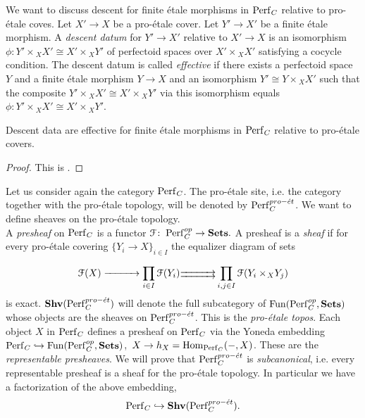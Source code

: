We want to discuss descent for finite \'{e}tale morphisms in $\mathrm{Perf}_{C}$ relative to pro-\'{e}tale coves.
Let $X'\to X$ be a pro-\'{e}tale cover. Let $Y'\to X'$ be a finite \'{e}tale morphism.
A \emph{descent datum} for $Y'\to X'$ relative to $X'\to X$ is an isomorphism $\phi\colon Y'\times\!_{X}X'\cong X'\times\!_{X}Y'$ of perfectoid spaces
over $X'\times\!_{X}X'$ satisfying a cocycle condition. The descent datum is called \emph{effective} if there exists a perfectoid space $Y$ and a finite \'{e}tale morphism $Y\to X$ and an isomorphism $Y'\cong  Y\times\!_{X}X'$ such that the composite $Y'\times\!_{X}X'\cong X'\times\!_{X}Y'$
via this isomorphism equals $\phi\colon Y'\times\!_{X}X'\cong X'\times\!_{X}Y'$.

\begin{prop}\label{descentprop1}
Descent data are effective for finite \'{e}tale morphisms in $\mathrm{Perf}_{C}$ relative to pro-\'{e}tale covers.
\end{prop}
\begin{proof}
This is \cite[proposition 4.2.4]{Weinstein16}.
\end{proof}



Let us consider again the category $\mathrm{Perf}_{C}$. The pro-\'{e}tale site, i.e. the category together with the pro-\'{e}tale topology, will be denoted by $\mathrm{Perf}_{C}^{pro-\acute{e}t}$. We want to define sheaves on the pro-\'{e}tale topology.\\

A \emph{presheaf} on $\mathrm{Perf}_{C}$ is a functor $\mathcal{F}\colon\:\mathrm{Perf}_{C}^{op}\to\mathbf{Sets}.$
A presheaf is a \emph{sheaf} if for every  pro-\'{e}tale covering $\{Y_i\to X\}_{i\in I}$ the equalizer diagram of sets

\[\mathcal{F}(X)  \xrightarrow{\hspace{1.05cm}} \prod_{i\in I}\mathcal{F}(Y_i)  \substack{\xrightarrow{\hspace{1.05cm}}\\[-1.2em] \xrightarrow{\hspace{1.05cm}}}  \prod_{i,j\in I}\mathcal{F}(Y_i\times\!_{X}Y_j)\]
is exact. $\mathbf{Shv}(\mathrm{Perf}_{C}^{pro-\acute{e}t})$ will denote the full subcategory of $\mathrm{Fun}(\mathrm{Perf}_{C}^{op},\mathbf{Sets})$ whose objects are the sheaves on $\mathrm{Perf}_{C}^{pro-\acute{e}t}$. This is the \emph{pro-\'{e}tale topos}.
Each object $X$ in $\mathrm{Perf}_{C}$ defines a presheaf on $\mathrm{Perf}_{C}$ via the Yoneda embedding $\mathrm{Perf}_{C}\hookrightarrow\mathrm{Fun}(\mathrm{Perf}_{C}^{op},\mathbf{Sets})$,\:\, $X\to{h_{X}}={\rm{Hom}}_{\mathrm{Perf}_{C}}(-,X)$.
These are the \emph{representable presheaves}. We will prove that $\mathrm{Perf}_{C}^{pro-\acute{e}t}$ is \emph{subcanonical}, i.e. every representable presheaf is a sheaf for the pro-\'{e}tale topology. 
In particular we have a factorization of the above embedding, \[\mathrm{Perf}_{C}\hookrightarrow\mathbf{Shv}(\mathrm{Perf}_{C}^{pro-\acute{e}t}).\]

